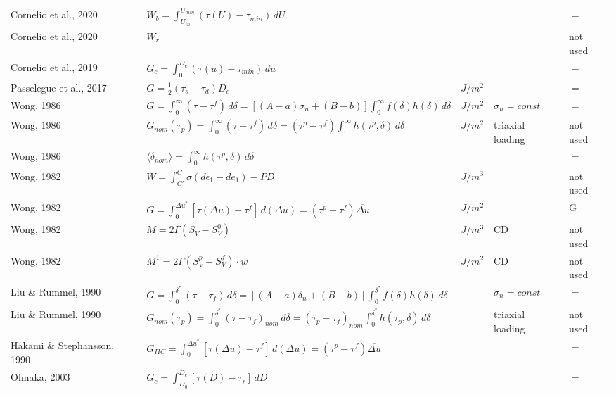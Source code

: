\documentclass{article}
\begin{document}
\begin{longtable}{|p{4 cm}|p{8 cm}|p{1.25 cm}|p{1.25 cm}|p{1.5 cm}|}
Cornelio et al., 2020 & \( \displaystyle W_b = \int_{U_{in}}^{U_{min}} (\tau(U) - \tau_{min}) \,d U \) & & & $=$ \\
Cornelio et al., 2020 & \( \displaystyle W_r \) & & & not used \\
Cornelio et al., 2019 & \( \displaystyle G_c = \int_{0}^{D_c} (\tau(u) - \tau_{min}) \,d u \) & & & $=$ \\
Passelegue et al., 2017 & \( \displaystyle G = \frac{1}{2} (\tau_s - \tau_d) D_c \) & $J/m^2$ & & $=$ \\
Wong, 1986 & \( \displaystyle G = \int_{0}^{\infty} (\tau - \tau^f) \,d \delta = [(A-a)\sigma_n + (B-b)] \int_{0}^{\infty} f(\delta) h(\delta) \,d \delta \) & $J/m^2$ & $\sigma_n = const $ & $=$ \\
Wong, 1986 & \( \displaystyle G_{nom}(\tau_p) = \int_{0}^{\infty} (\tau-\tau^f) \,d\delta = (\tau^p-\tau^f) \int_{0}^{\infty} h(\tau^p,\delta) \,d\delta \) & $J/m^2$ & triaxial loading & not used \\
Wong, 1986 & \( \displaystyle \langle \delta_{nom} \rangle = \int_{0}^{\infty} h(\tau^p,\delta) \,d\delta \) & & & $=$ \\
Wong, 1982 & \( \displaystyle W = \int_{C'}^{C} \sigma(d \epsilon_1 - d e_1) - P D \) & $J/m^3$ & & not used \\
Wong, 1982 & \( \displaystyle \underline{G} = \int_{0}^{\Delta u^*} [\tau(\Delta u) -\tau^f] \,d(\Delta u) = (\tau^p-\tau^f) \overline{\Delta u} \) & $J/m^2$ & & G \\
Wong, 1982 & \( \displaystyle M = 2 \Gamma (S_V - S_V^0) \) & $J/m^3$ & CD & not used \\
Wong, 1982 & \( \displaystyle M^1 = 2 \Gamma (S_V^p - S_V^f) \cdot w \) & $J/m^2$ & CD & not used \\
Liu \& Rummel, 1990 & \( \displaystyle G = \int_{0}^{\delta^*} (\tau - \tau_f) \,d\delta = [(A-a)\delta_n + (B-b)] \int_{0}^{\delta^*} f(\delta) h(\delta) \,d\delta \) & & $\sigma_n = const$ & $=$ \\
Liu \& Rummel, 1990 & \( \displaystyle G_{nom}(\tau_p) = \int_{0}^{\delta^*} (\tau - \tau_f)_{nom} \,d\delta = (\tau_p-\tau_f)_{nom} \int_{0}^{\delta^*} h(\tau_p,\delta) \,d\delta \) & & triaxial loading & not used \\
Hakami \& Stephansson, 1990 & \( \displaystyle G_{IIC} = \int_{0}^{\Delta u^*} [\tau(\Delta u) - \tau^f] \,d(\Delta u) = (\tau^p - \tau^f) \overline{\Delta u} \) & & & $=$ \\
Ohnaka, 2003 & \( \displaystyle G_c = \int_{D_0}^{D_c} [\tau(D)-\tau_r] \,dD \) & & & $=$ \\

\end{longtable}
\end{document}
